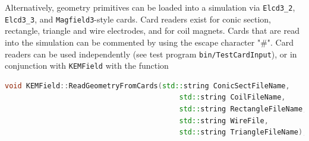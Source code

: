 \documentclass[11pt,a4paper,oneside]{article}
\begin{document}
Alternatively, geometry primitives can be loaded into a simulation via \texttt{Elcd3\_2}, \texttt{Elcd3\_3}, and \texttt{Magfield3}-style cards.  Card readers exist for conic section, rectangle, triangle and wire electrodes, and for coil magnets.  Cards that are read into the simulation can be commented by using the escape character "\#".  Card readers can be used independently (see test program \texttt{bin/TestCardInput}), or in conjunction with \texttt{KEMField} with the function
%
\begin{lstlisting}[language=C++]
    void KEMField::ReadGeometryFromCards(std::string ConicSectFileName,
                                         std::string CoilFileName,
                                         std::string RectangleFileName,
                                         std::string WireFile,
                                         std::string TriangleFileName);
\end{lstlisting}

\end{document}
